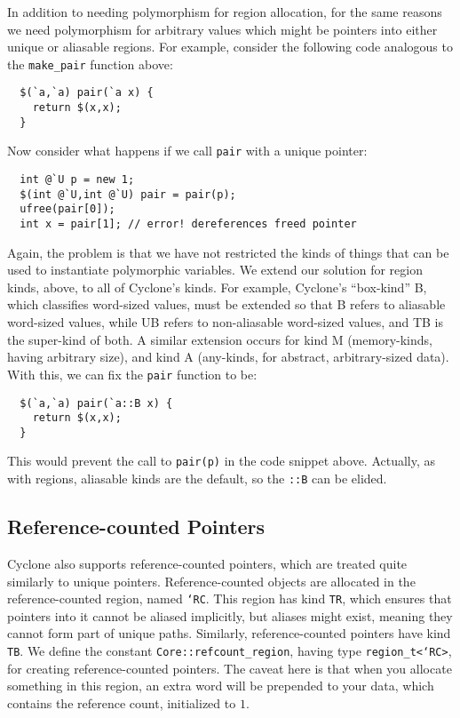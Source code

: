 In addition to needing polymorphism for region allocation, for the same
reasons we need polymorphism for arbitrary values which might be pointers
into either unique or aliasable regions.  For example, consider the
following code analogous to the \texttt{make\_pair} function above:
\begin{verbatim}
  $(`a,`a) pair(`a x) {
    return $(x,x);
  }
\end{verbatim}
Now consider what happens if we call \texttt{pair} with a unique pointer:
\begin{verbatim}
  int @`U p = new 1;
  $(int @`U,int @`U) pair = pair(p);
  ufree(pair[0]);
  int x = pair[1]; // error! dereferences freed pointer
\end{verbatim}%
Again, the problem is that we have not restricted the kinds of things that
can be used to instantiate polymorphic variables.  We extend our solution
for region kinds, above, to all of Cyclone's kinds.  For example, Cyclone's
``box-kind'' B, which classifies word-sized values, must be extended so that
B refers to aliasable word-sized values, while UB refers to non-aliasable
word-sized values, and TB is the super-kind of both.  A similar extension
occurs for kind M (memory-kinds, having arbitrary size), and kind A
(any-kinds, for abstract, arbitrary-sized data).  With this, we can fix the
\texttt{pair} function to be:
\begin{verbatim}
  $(`a,`a) pair(`a::B x) {
    return $(x,x);
  }
\end{verbatim}
This would prevent the call to \texttt{pair(p)} in the code snippet above.
Actually, as with regions, aliasable kinds are the default, so the
\texttt{::B} can be elided.

\subsection{Reference-counted Pointers}

Cyclone also supports reference-counted pointers, which are treated quite
similarly to unique pointers.  Reference-counted objects are allocated in
the reference-counted region, named \texttt{`RC}. This region has kind
\texttt{TR}, which ensures that pointers into it cannot be aliased
implicitly, but aliases might exist, meaning they cannot form part of unique
paths.  Similarly, reference-counted pointers have kind \texttt{TB}.  We
define the constant \texttt{Core::refcount_region}, having type
\texttt{region_t<`RC>}, for creating reference-counted pointers.  The caveat
here is that when you allocate something in this region, an extra word will
be prepended to your data, which contains the reference count, initialized
to $1$.

